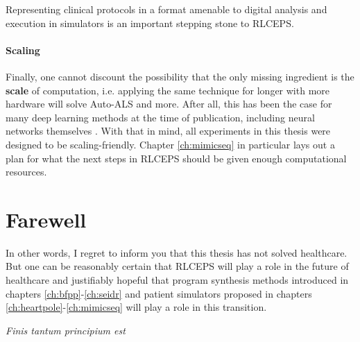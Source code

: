 Representing clinical protocols in a format amenable to digital analysis and execution in simulators is an important stepping stone to RLCEPS.

\paragraph{Scaling}

Finally, one cannot discount the possibility that the only missing ingredient is the \textbf{scale} of computation, i.e. applying the same technique for longer with more hardware will solve Auto-ALS and more.
After all, this has been the case for many deep learning methods at the time of publication, including neural networks themselves \cite{schmidhuberAnnotatedHistoryModern2022}.
With that in mind, all experiments in this thesis were designed to be scaling-friendly.
Chapter \ref{ch:mimicseq} in particular lays out a plan for what the next steps in RLCEPS should be given enough computational resources.

\section{Farewell}

In other words, I regret to inform you that this thesis has not solved healthcare.
But one can be reasonably certain that RLCEPS will play a role in the future of healthcare and justifiably hopeful that program synthesis methods introduced in chapters \ref{ch:bfpp}-\ref{ch:seidr} and patient simulators proposed in chapters \ref{ch:heartpole}-\ref{ch:mimicseq} will play a role in this transition.

\emph{Finis tantum principium est}